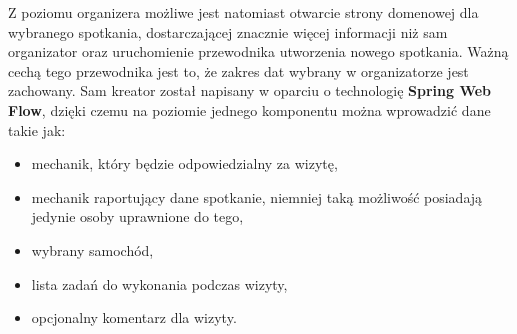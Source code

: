 	Z poziomu organizera możliwe jest natomiast otwarcie strony domenowej dla wybranego spotkania, dostarczającej znacznie więcej informacji niż sam organizator oraz uruchomienie przewodnika utworzenia nowego spotkania. Ważną cechą tego przewodnika jest to, że zakres dat wybrany w organizatorze jest zachowany. Sam kreator został napisany w oparciu o technologię \textbf{Spring Web Flow}, dzięki czemu na poziomie jednego komponentu można wprowadzić dane takie jak: 
	\begin{itemize}
		\item mechanik, który będzie odpowiedzialny za wizytę,
		\item mechanik raportujący dane spotkanie, niemniej taką możliwość posiadają jedynie osoby uprawnione do tego,
		\item wybrany samochód,
		\item lista zadań do wykonania podczas wizyty,
		\item opcjonalny komentarz dla wizyty.
	\end{itemize}
	
